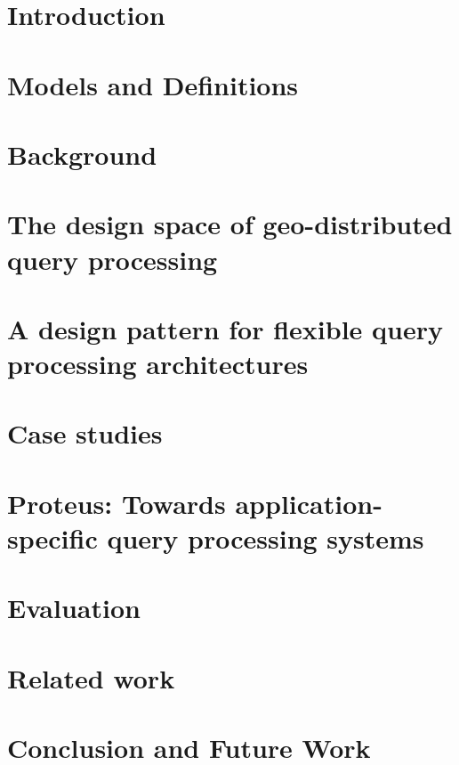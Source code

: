 \chapter{Introduction}
\label{ch:intro}


\chapter{Models and Definitions}
\label{ch:models}


\chapter{Background}
\label{ch:background}


\chapter{The design space of geo-distributed query processing}
\label{ch:design_space}


\chapter{A design pattern for flexible query processing architectures}
\label{ch:design_pattern}


\chapter{Case studies}
\label{ch:case_studies}


% 

\chapter{Proteus: Towards application-specific query processing systems}
\label{ch:proteus}


\chapter{Evaluation}
\label{ch:evaluation}


\chapter{Related work}
\label{ch:related_work}


\chapter{Conclusion and Future Work}
\label{ch:conclusion}

